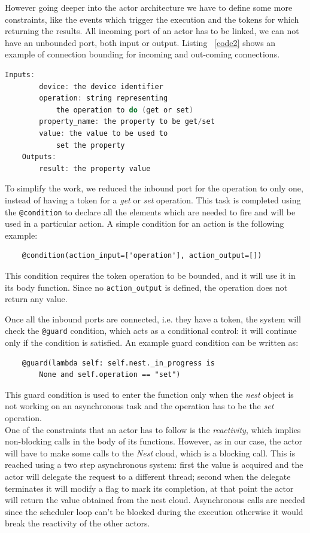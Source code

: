 However going deeper into the actor architecture we have to define some more constraints,
like the events which trigger the execution and the tokens for which returning the results.
All incoming port of an actor has to be linked, we can not have an unbounded port,
both input or output. Listing ~\ref{code2} shows an example of connection bounding for incoming
and out-coming connections.\pagebreak


\begin{lstlisting}[language=C,frame=single,caption=Example resource response,label=code2]
    Inputs:
        device: the device identifier
        operation: string representing
            the operation to do (get or set)
        property_name: the property to be get/set
        value: the value to be used to
            set the property
    Outputs:
        result: the property value
\end{lstlisting}

To simplify the work, we reduced the inbound port for the operation to only one, instead of having a token
for a \textit{get} or \textit{set} operation. This task is completed using the \texttt{@condition} to declare
all the elements which are needed to fire and will be used in a particular action.
A simple condition for an action is the following example:
\begin{verbatim}
    @condition(action_input=['operation'], action_output=[])
\end{verbatim}
This condition requires the token operation to be bounded, and it will use it in its body function. Since
no \texttt{action\_output} is defined, the operation does not return any value.

Once all the inbound ports are connected, i.e. they have a token, the system will check the \texttt{@guard} condition,
which acts as a conditional control: it will continue only if the condition is satisfied.
An example guard condition can be written as:

\begin{verbatim}
    @guard(lambda self: self.nest._in_progress is
        None and self.operation == "set")
\end{verbatim}
This guard condition is used to enter the function only when the \textit{nest} object is not
working on an asynchronous task and the operation has to be the \textit{set} operation.\\
One of the constraints that an actor has to follow is the \textit{reactivity}, which implies
non-blocking calls in the body of its functions. However, as in our case, the actor will have to
make some calls to the \textit{Nest} cloud, which is a blocking call. This is reached
using a two step asynchronous system: first the value is acquired and the actor
will delegate the request to a different thread; second when the delegate terminates it will
modify a flag to mark its completion, at that point the actor will return the value obtained
from the nest cloud. Asynchronous calls are needed since the scheduler loop can't be blocked
during the execution otherwise it would break the reactivity of the other actors.

